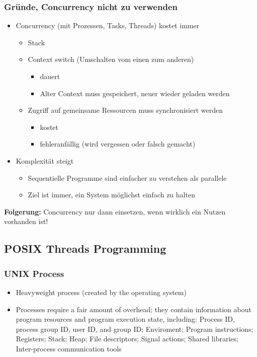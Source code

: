 \subsubsection{Gründe, Concurrency nicht zu verwenden}
\begin{itemize}
  \item Concurrency (mit Prozessen, Tasks, Threads) kostet immer
  \begin{itemize}
  	\item Stack
  	\item Context switch (Umschalten vom einen zum anderen) 
  	  \begin{itemize}
  	  \item dauert
  	  \item Alter Context muss gespeichert, neuer wieder geladen werden
  	  \end{itemize}
  	\item Zugriff auf gemeinsame Ressourcen muss synchronisiert werden 
  	  \begin{itemize}
  	  \item kostet
  	  \item fehleranfällig (wird vergessen oder falsch gemacht)
  	  \end{itemize}
  \end{itemize}
\item Komplexität steigt
  \begin{itemize}
  \item Sequentielle Programme sind einfacher zu verstehen als parallele
  \item Ziel ist immer, ein System möglichst einfach zu halten
  \end{itemize}
\end{itemize}

\textbf{Folgerung:} Concurrency nur dann einsetzen, wenn wirklich ein Nutzen vorhanden ist!

\subsection{POSIX Threads Programming}
\subsubsection{UNIX Process}
\begin{itemize}
\item Heavyweight process (created by the operating system)
\item Processes require a fair amount of overhead; they contain information about program resources and program execution state, including: Process ID, process group ID, user ID, and group ID; Enviroment; Program instructions; Registers; Stack; Heap; File descriptors; Signal actions; Shared libraries; Inter-process communication tools
\end{itemize}
